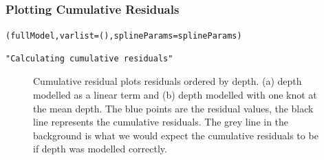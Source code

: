 \begin{frame}[fragile]
\frametitle{Plotting Cumulative Residuals}
\begin{knitrout}\footnotesize
{}\color{fgcolor}\begin{kframe}
\begin{alltt}
(fullModel, varlist= (), splineParams=splineParams)
\end{alltt}
\begin{verbatim}
"Calculating cumulative residuals"
\end{verbatim}
\end{kframe}
\end{knitrout}

\begin{figure}[h]
  \centering
  \hfill
\caption{Cumulative residual plots residuals ordered by depth. (a) depth modelled as a linear term and (b) depth modelled with one knot at the mean depth.  The blue points are the residual values, the black line represents the cumulative residuals. The grey line in the background is what we would expect the cumulative residuals to be if depth was modelled correctly.}
\label{fig:cumres1}
\end{figure}
\end{frame}

